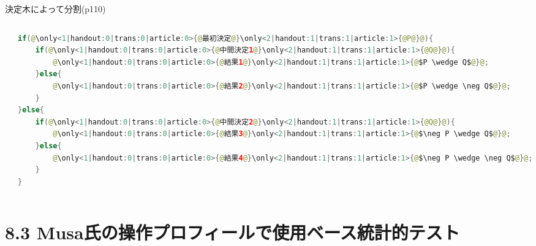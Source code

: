 \begin{frame}[fragile]{決定木によって分割(p110)}
\begin{columns}
\begin{column}{0.5\textwidth}

\end{column}

\begin{column}{0.5\textwidth}
\begin{lstlisting}[language=java,escapechar=@]
if(@\only<1|handout:0|trans:0|article:0>{@最初決定@}\only<2|handout:1|trans:1|article:1>{@P@}@){
    if(@\only<1|handout:0|trans:0|article:0>{@中間決定1@}\only<2|handout:1|trans:1|article:1>{@Q@}@){
        @\only<1|handout:0|trans:0|article:0>{@結果1@}\only<2|handout:1|trans:1|article:1>{@$P \wedge Q$@}@;
    }else{
        @\only<1|handout:0|trans:0|article:0>{@結果2@}\only<2|handout:1|trans:1|article:1>{@$P \wedge \neg Q$@}@;
    }
}else{
    if(@\only<1|handout:0|trans:0|article:0>{@中間決定2@}\only<2|handout:1|trans:1|article:1>{@Q@}@){
        @\only<1|handout:0|trans:0|article:0>{@結果3@}\only<2|handout:1|trans:1|article:1>{@$\neg P \wedge Q$@}@;
    }else{
        @\only<1|handout:0|trans:0|article:0>{@結果4@}\only<2|handout:1|trans:1|article:1>{@$\neg P \wedge \neg Q$@}@;
    }
}
\end{lstlisting}
\end{column}
\end{columns}
\end{frame}
\section{8.3 Musa氏の操作プロフィールで使用ベース統計的テスト}
